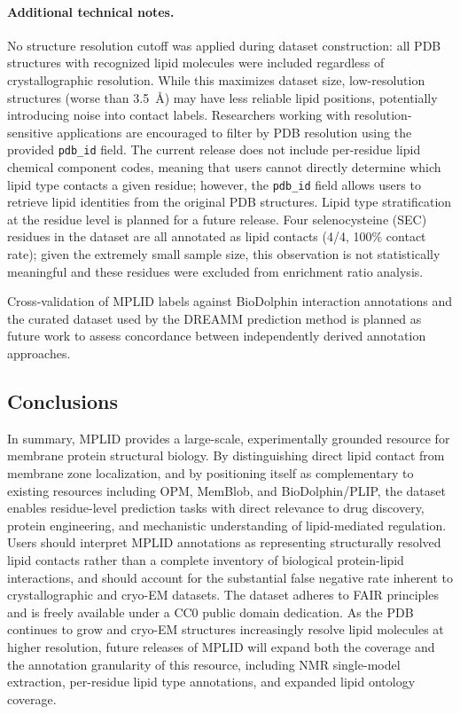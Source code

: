 \documentclass[unnumsec,webpdf,contemporary,large]{oup-authoring-template}
\begin{document}
\paragraph{Additional technical notes.} No structure resolution cutoff was applied during dataset construction: all PDB structures with recognized lipid molecules were included regardless of crystallographic resolution. While this maximizes dataset size, low-resolution structures (worse than 3.5~\AA{}) may have less reliable lipid positions, potentially introducing noise into contact labels. Researchers working with resolution-sensitive applications are encouraged to filter by PDB resolution using the provided \texttt{pdb\_id} field. The current release does not include per-residue lipid chemical component codes, meaning that users cannot directly determine which lipid type contacts a given residue; however, the \texttt{pdb\_id} field allows users to retrieve lipid identities from the original PDB structures. Lipid type stratification at the residue level is planned for a future release. Four selenocysteine (SEC) residues in the dataset are all annotated as lipid contacts (4/4, 100\% contact rate); given the extremely small sample size, this observation is not statistically meaningful and these residues were excluded from enrichment ratio analysis.

Cross-validation of MPLID labels against BioDolphin \cite{biodolphin2024} interaction annotations and the curated dataset used by the DREAMM prediction method \cite{chatzigoulas2022} is planned as future work to assess concordance between independently derived annotation approaches.

\subsection{Conclusions}

In summary, MPLID provides a large-scale, experimentally grounded resource for membrane protein structural biology. By distinguishing direct lipid contact from membrane zone localization, and by positioning itself as complementary to existing resources including OPM, MemBlob, and BioDolphin/PLIP, the dataset enables residue-level prediction tasks with direct relevance to drug discovery, protein engineering, and mechanistic understanding of lipid-mediated regulation. Users should interpret MPLID annotations as representing structurally resolved lipid contacts rather than a complete inventory of biological protein-lipid interactions, and should account for the substantial false negative rate inherent to crystallographic and cryo-EM datasets. The dataset adheres to FAIR principles and is freely available under a CC0 public domain dedication. As the PDB continues to grow and cryo-EM structures increasingly resolve lipid molecules at higher resolution, future releases of MPLID will expand both the coverage and the annotation granularity of this resource, including NMR single-model extraction, per-residue lipid type annotations, and expanded lipid ontology coverage.
\end{document}
